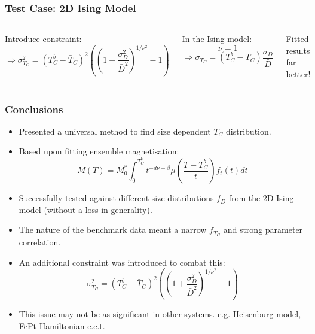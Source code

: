 \documentclass{beamer}
\begin{document}
\begin{frame}
	\frametitle{Test Case: 2D Ising Model}
	\begin{columns}
	\column{7cm}
		Introduce constraint\footnotemark[5]:
		$$
		\Rightarrow \sigma_{T_C}^2 = (T_C^b - \bar{T}_C)^2\left(\left(1 + \frac{\sigma_D^2}{\bar{D}^2}\right)^{1/\nu^2}-1\right)
		$$
		
		In the Ising model:
		$$
		\nu = 1
		$$
		$$
		\Rightarrow \sigma_{T_C} = (T_C^b - \bar{T}_C)\frac{\sigma_D}{\bar{D}}
		$$
		\begin{center}\vspace{2mm}
		
		Fitted results far better!
		\end{center}
	\column{5cm}
		\includegraphics[width=4.5cm]{Images/distros}
		
		\includegraphics[width=4.5cm]{Images/constr}
	\end{columns}
\end{frame}

\begin{frame}
	\frametitle{Conclusions}
	\small{
	\begin{itemize}
		\item{Presented a universal method to find size dependent $T_C$ distribution.}
		\item{Based upon fitting ensemble magnetisation:}
		$$
		M(T) = M_0^*\int_0^{T_C^b} t^{-d\nu +\beta} \mu\left(\frac{T-T_C^b}{t}\right) f_t(t) dt
		$$
		\item{Successfully tested against different size distributions $f_D$ from the 2D Ising model (without a loss in generality).}
		\item{The nature of the benchmark data meant a narrow $f_{T_C}$ and strong parameter correlation.}
		\item{An additional constraint was introduced to combat this:}
		$$
		\sigma_{T_C}^2 = (T_C^b - \bar{T}_C)^2\left(\left(1 + \frac{\sigma_D^2}{\bar{D}^2}\right)^{1/\nu^2}-1\right)
		$$
		\item{This issue may not be as significant in other systems. e.g. Heisenburg model, FePt Hamiltonian e.c.t.}
	\end{itemize}}
\end{frame}
\end{document}
